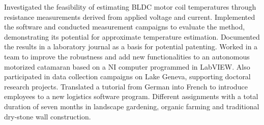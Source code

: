 \documentclass[10pt,a4paper,sans]{moderncv}
\begin{document}
    {
        Investigated the feasibility of estimating BLDC motor coil temperatures through resistance measurements derived from applied voltage and current. Implemented the software and conducted measurement campaigns to evaluate the method, demonstrating its potential for approximate temperature estimation. Documented the results in a laboratory journal as a basis for potential patenting.
    }
    {
        Worked in a team to improve the robustness and add new functionalities to an autonomous motorized catamaran based on a NI computer programmed in LabVIEW. Also participated in data collection campaigns on Lake Geneva, supporting doctoral research projects.
    }
    {
        Translated a tutorial from German into French to introduce employees to a new logistics software program.
    }
    {
        Different assignments with a total duration of seven months in landscape gardening, organic farming and traditional dry-stone wall construction.
    }
\end{document}
